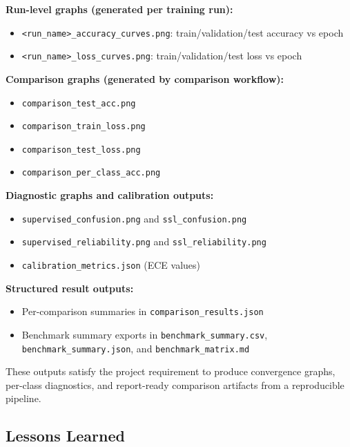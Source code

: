\textbf{Run-level graphs (generated per training run):}

\begin{itemize}
    \item \texttt{<run\_name>\_accuracy\_curves.png}: train/validation/test accuracy vs epoch
    \item \texttt{<run\_name>\_loss\_curves.png}: train/validation/test loss vs epoch
\end{itemize}

\textbf{Comparison graphs (generated by comparison workflow):}

\begin{itemize}
    \item \texttt{comparison\_test\_acc.png}
    \item \texttt{comparison\_train\_loss.png}
    \item \texttt{comparison\_test\_loss.png}
    \item \texttt{comparison\_per\_class\_acc.png}
\end{itemize}

\textbf{Diagnostic graphs and calibration outputs:}

\begin{itemize}
    \item \texttt{supervised\_confusion.png} and \texttt{ssl\_confusion.png}
    \item \texttt{supervised\_reliability.png} and \texttt{ssl\_reliability.png}
    \item \texttt{calibration\_metrics.json} (ECE values)
\end{itemize}

\textbf{Structured result outputs:}

\begin{itemize}
    \item Per-comparison summaries in \texttt{comparison\_results.json}
    \item Benchmark summary exports in \texttt{benchmark\_summary.csv}, \texttt{benchmark\_summary.json}, and \texttt{benchmark\_matrix.md}
\end{itemize}

These outputs satisfy the project requirement to produce convergence graphs, per-class diagnostics, and report-ready comparison artifacts from a reproducible pipeline.

\subsection{Lessons Learned}

